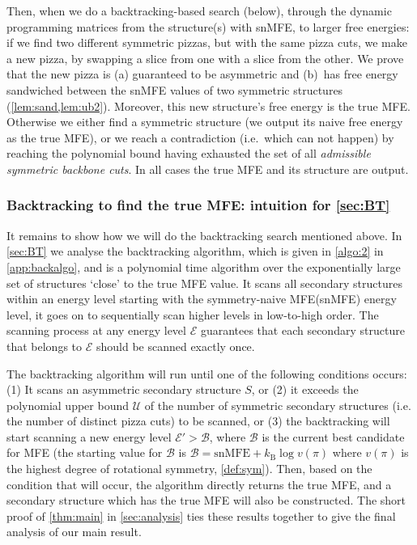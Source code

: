 \documentclass[11pt,letterpaper]{article}  \usepackage[margin=1in]{geometry}
\theoremstyle{definition}  \newtheorem{Definition}[theorem]{Definition}
\newcommand{\snMFE}{snMFE\xspace}
\newcommand{\symnMFE}{symmetry-naive MFE\xspace}
\begin{document}
Then, when we do a backtracking-based search (below), 
through the dynamic programming matrices from the structure(s) with \snMFE, to larger free energies:  
if we find two different symmetric pizzas, but with the same pizza cuts,  we make a new pizza, by swapping a slice from one with a slice from the other.  
We prove that the new pizza is (a) guaranteed to be asymmetric and (b)~has free energy sandwiched between the {\snMFE} values of  two symmetric structures  (\cref{lem:sand,lem:ub2}). 
Moreover, this new structure's free energy is the true MFE. 
Otherwise we either find a symmetric structure (we output its naive free energy as the true MFE), or we reach a contradiction (i.e.~which can not happen) by reaching the polynomial bound having exhausted the set of all \emph{admissible symmetric backbone cuts}. In all cases the true MFE and its structure are output. 




\subsubsection{Backtracking to find the true MFE: intuition for \cref{sec:BT}} 

It remains to show how we will do the backtracking search mentioned above. 
In \cref{sec:BT} we analyse the  backtracking algorithm, which is given in \cref{algo:2} in \cref{app:backalgo}, and  
is a polynomial time  algorithm over the exponentially large set of structures `close' to the true MFE value. 
It scans all secondary structures within an energy level starting with the \symnMFE (\snMFE) energy level, it goes on to sequentially scan higher levels in low-to-high order. 
The scanning process at any energy level $\mathcal{E}$  guarantees that each secondary structure that belongs to $\mathcal{E}$ should be scanned exactly once. 

The backtracking algorithm will run until one of the following conditions occurs:
(1) It scans an asymmetric secondary structure $S$, or 
(2) it exceeds the polynomial upper bound $\mathcal{U}$ of the number of symmetric secondary structures (i.e. the number of distinct  pizza cuts) to be scanned, or 
(3) the backtracking will start scanning a new energy level $\mathcal{E}' > \mathcal{B}$, where $\mathcal{B}$ is the current best candidate for MFE (the starting value for $\mathcal{B}$ is  $\mathcal{B} = \mathrm{\snMFE} + k_\mathrm{B} \log v(\pi)$ where $v(\pi)$ is the highest degree of rotational symmetry, \cref{def:sym}). 
Then, based on the condition that will occur, the algorithm directly returns the true MFE, and a secondary structure which has the true MFE will also be constructed. 
The short proof of \cref{thm:main} in \cref{sec:analysis} ties these results together to give the final analysis of our main result.
\end{document}
